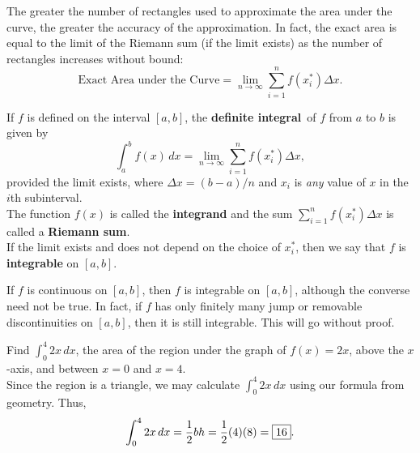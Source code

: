 \documentclass{book}
\newcommand{\dx}{\,dx}
\newcommand{\dint}{\displaystyle \int}
\begin{document}
The greater the number of rectangles used to approximate the area under the curve, the greater the accuracy of the approximation. In fact, the exact area is equal to the limit of the Riemann sum (if the limit exists) as the number of rectangles increases without bound: \[\mbox{Exact Area under the Curve} = \lim_{n\to\infty} \sum_{i=1}^n f(x_i^*)\Delta x.\]
\begin{Def} If $f$ is defined on the interval $[a,b]$, the \textbf{definite integral}\footnotemark\ of $f$ from $a$ to $b$ is given by \[\int_a^b f(x)\dx = \lim_{n\to \infty} \sum_{i=1}^n f(x_i^*)\Delta x,\] provided the limit exists, where $\Delta x = (b-a)/n$ and $x_i$ is \emph{any} value of $x$ in the $i$th subinterval.\\

The function $f(x)$ is called the \textbf{integrand} and the sum $\sum_{i=1}^n f(x_i^*)\Delta x$ is called a \textbf{Riemann sum}.\\

If the limit exists and does not depend on the choice of $x_i^*$, then we say that $f$ is \textbf{integrable} on $[a,b]$.
\end{Def}\vs

If $f$ is continuous on $[a,b]$, then $f$ is integrable on $[a,b]$, although the converse need not be true. In fact, if $f$ has only finitely many jump or removable discontinuities on $[a,b]$, then it is still integrable. This will go without proof. 

\begin{Exam} Find $\dint_0^4 2x\dx$, the area of the region under the graph of $f(x) = 2x$, above the $x$-axis, and between $x=0$ and $x=4$.\\

Since the region is a triangle, we may calculate  $\dint_0^4 2x\dx$ using our formula from geometry. Thus, \[ \int_0^4 2x\dx = \dfrac{1}{2}bh = \dfrac{1}{2}(4)(8) = \fbox{$16$}. \] 
\end{Exam}\vs


%
\end{document}
